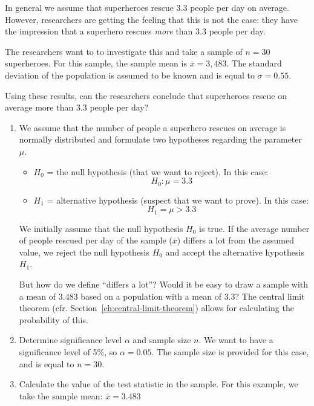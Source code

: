 \begin{example}
  \label{ex:hypothesis-test-daily-rescues}
  In general we assume that superheroes rescue 3.3 people per day on average. However, researchers are getting the feeling that this is not the case: they have the impression that a superhero rescues \emph{more} than $3.3$ people per day.

  The researchers want to to investigate this and take a sample of $n = 30$ superheroes. For this sample, the sample mean is $\overline{x} = 3,483$. The standard deviation of the population is assumed to be known and is equal to $\sigma = 0.55$.
  
  Using these results, can the researchers conclude that superheroes rescue on average more than 3.3 people per day?

  \begin{enumerate}
    \item We assume that the number of people a superhero rescues on average is normally distributed and formulate two hypotheses regarding the parameter $\mu$.
    \begin{itemize}
      \item $H_{0}$ = the null hypothesis (that we want to reject). In this case: \[ H_{0} : \mu = 3.3 \]
      \item $H_{1}$ = alternative hypothesis (suspect that we want to prove). In this case: \[H_{1}= \mu > 3.3 \]
    \end{itemize}
  
    We initially assume that the null hypothesis $H_{0}$ is true. If the average number of people rescued per day of the sample ($\overline{x}$) differs a lot from the assumed value, we reject the null hypothesis $H_{0}$ and accept the alternative hypothesis $H_{1}$.

    But how do we define ``differs a lot''? Would it be easy to draw a sample with a mean of $3.483$ based on a population with a mean of $3.3$? The central limit theorem (cfr. Section~\ref{ch:central-limit-theorem}) allows for calculating the probability of this.
    
    \item Determine significance level $\alpha$ and sample size $n$. We want to have a significance level of 5\%, so $\alpha = 0.05$. The sample size is provided for this case, and is equal to $n = 30$.
    
    \item Calculate the value of the test statistic in the sample. For this example, we take the sample mean: $\overline{x} = 3.483$
    

\end{enumerate}
\end{example}
